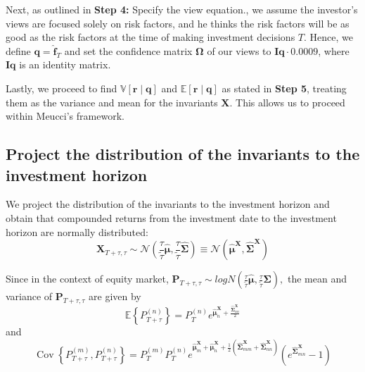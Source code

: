 \documentclass[13pt]{article}
\theoremstyle{definition}
\theoremstyle{remark}
\begin{document}
\begin{enumerate}
Next, as outlined in {\color{C6}\textbf{Step 4:} Specify the view equation.}, we assume the investor's views are focused solely on risk factors, and he thinks the risk factors will be as good as the risk factors at the time of making investment decisions $T$. Hence, we define $\bm{q}=\hat{\boldsymbol{f}}_T$ and set the confidence matrix $\mathbf{\Omega}$ of our views to $\mathbf{I}{\bm{q}}\cdot 0.0009$, where $\mathbf{I}{\bm{q}}$ is an identity matrix.

Lastly, we proceed to find $\mathbb{V}[\boldsymbol{r} \mid \boldsymbol{q}]$ and $\mathbb{E}[\boldsymbol{r} \mid \boldsymbol{q}]$ as stated in {\color{C6}\textbf{Step 5}}, treating them as the variance and mean for the invariants $\mathbf{X}$. This allows us to proceed within Meucci's framework.
\end{enumerate}

\subsection{Project the distribution of the invariants to the investment horizon}

We project the distribution of the invariants to the investment horizon and obtain that compounded returns from the investment date to the investment horizon are normally distributed:
$$
\mathbf{X}_{T+\tau, \tau} \sim \mathcal{N}\left(\frac{\tau}{\widetilde{\tau}} \widehat{\boldsymbol{\mu}}, \frac{\tau}{\widetilde{\tau}} \widehat{\boldsymbol{\Sigma}}\right) \equiv \mathcal{N}\left(\widehat{\boldsymbol{\mu}}^{\mathbf{X}},\widehat{\boldsymbol{\Sigma}}^{\mathbf{X}}\right) 
$$

Since in the context of equity market, 
$\mathbf{P}_{T+\tau, \tau} \sim logN\left(\frac{\tau}{\widetilde{\tau}} \widehat{\boldsymbol{\mu}}, \frac{\tau}{\widetilde{\tau}} \widehat{\boldsymbol{\Sigma}}\right),
$
the mean and variance of $\mathbf{P}_{T+\tau, \tau}$ are given by
$$
\mathbb{E}\left\{P_{T+\tau}^{(n)}\right\} 
=P_T^{(n)} e^{\widehat{\boldsymbol{\mu}}^{\mathbf{X}}_n+\frac{\widehat{\boldsymbol{\Sigma}}^{\mathbf{X}}_{n n}}{2}}
$$
and 
$$
\operatorname{Cov}\left\{P_{T+\tau}^{(m)}, P_{T+\tau}^{(n)}\right\}= P_T^{(m)} P_T^{(n)} e^{\widehat{\boldsymbol{\mu}}^{\mathbf{X}}_m+\widehat{\boldsymbol{\mu}}^{\mathbf{X}}_n+\frac{1}{2}\left(\widehat{\boldsymbol{\Sigma}}^{\mathbf{X}}_{mm}+\widehat{\boldsymbol{\Sigma}}^{\mathbf{X}}_{nn}\right)} \left(e^{\widehat{\boldsymbol{\Sigma}}^{\mathbf{X}}_{m n}}-1\right)
$$
\end{document}
